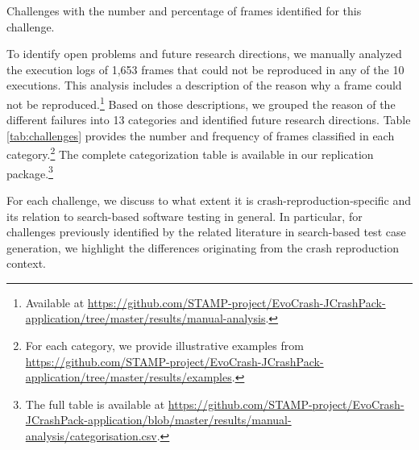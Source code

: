 
\begin{table}[t]
    \centering
	\caption{Challenges with the number and percentage of frames identified for this challenge.}
	\label{tab:challenges}
	
\end{table}

To identify open problems and future research directions, we manually analyzed the execution logs of 1,653 frames that could not be reproduced in any of the 10 executions.
This analysis includes a description of the reason why a frame could not be reproduced.\footnote{Available at \url{https://github.com/STAMP-project/EvoCrash-JCrashPack-application/tree/master/results/manual-analysis}.}
Based on those descriptions, we grouped the reason of the different failures into 13 categories and identified future research directions.
%
Table \ref{tab:challenges} provides the number and frequency of frames classified in each category.\footnote{For each category, we provide illustrative examples from \url{https://github.com/STAMP-project/EvoCrash-JCrashPack-application/tree/master/results/examples}.} The complete categorization table is available in our replication package.\footnote{The full table is available at \url{https://github.com/STAMP-project/EvoCrash-JCrashPack-application/blob/master/results/manual-analysis/categorisation.csv}.} 


For each challenge, we discuss to what extent it is crash-reproduction-specific and its relation to search-based software testing in general. In particular, for challenges previously identified by the related literature in search-based test case generation, we highlight the differences originating from the crash reproduction context.



